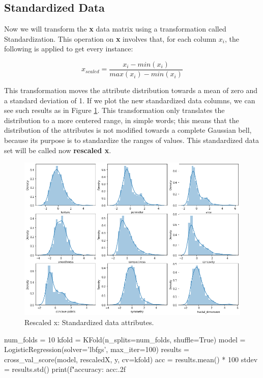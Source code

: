 \documentclass[11pt]{article}
\begin{document}
\subsection{Standardized Data}

Now we will transform the \textbf{x} data matrix using a transformation called Standardization. This operation on \textbf{x} involves that, for each column $x_i$, the following is applied to get every instance:

\begin{equation}
    x_{scaled}=\frac{x_i-min(x_i)}{max(x_i)-min(x_i)}
\end{equation}

This transformation moves the attribute distribution towards a mean of zero and a standard deviation of 1. If we plot the new standardized data columns, we can see such results as in Figure \ref{fig:stand}. This transformation only translates the distribution to a more centered range, in simple words; this means that the distribution of the attributes is not modified towards a complete Gaussian bell, because its purpose is to standardize the ranges of values. This standardized data set will be called now \textbf{rescaled x}.
 
\begin{figure}[!ht]
\centering
    \includegraphics[width=6in]{rescaledX.png}
    \caption{Rescaled x: Standardized data attributes.}
    \label{fig:stand}
\end{figure}

\begin{python}
num_folds = 10
kfold = KFold(n_splits=num_folds, shuffle=True) 
model = LogisticRegression(solver='lbfgs', max_iter=100)
results = cross_val_score(model, rescaledX, y, cv=kfold)
acc = results.mean() * 100
stdev = results.std()
print(f"accuracy: {acc:.2f}%
\end{python}
\end{document}
